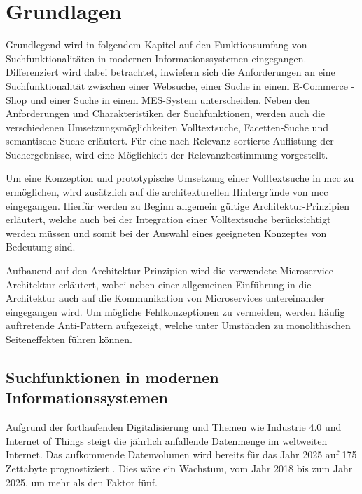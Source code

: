 \chapter{Grundlagen\label{chap2:Zweites-Kapitel}}

Grundlegend wird in folgendem Kapitel auf den Funktionsumfang von Suchfunktionalitäten in modernen Informationssystemen eingegangen. Differenziert wird dabei betrachtet, inwiefern sich die Anforderungen an eine Suchfunktionalität zwischen einer Websuche, einer Suche in einem E-Commerce - Shop und einer Suche in einem MES-System unterscheiden. Neben den Anforderungen und Charakteristiken der Suchfunktionen, werden auch die verschiedenen Umsetzungsmöglichkeiten \glqq Volltextsuche\grqq{}, \glqq Facetten-Suche\grqq{} und \glqq semantische Suche\grqq{} erläutert. Für eine nach Relevanz sortierte Auflistung der Suchergebnisse, wird eine Möglichkeit der Relevanzbestimmung vorgestellt.


Um eine Konzeption und prototypische Umsetzung einer Volltextsuche in \gls{mcc} zu ermöglichen, wird zusätzlich auf die architekturellen Hintergründe von \gls{mcc} eingegangen. Hierfür werden zu Beginn allgemein gültige Architektur-Prinzipien erläutert, welche auch bei der Integration einer Volltextsuche berücksichtigt werden müssen und somit bei der Auswahl eines geeigneten Konzeptes von Bedeutung sind.

Aufbauend auf den Architektur-Prinzipien wird die verwendete Microservice-Architektur erläutert, wobei neben einer allgemeinen Einführung in die Architektur auch auf die Kommunikation von Microservices untereinander eingegangen wird. Um mögliche Fehlkonzeptionen zu vermeiden, werden häufig auftretende Anti-Pattern aufgezeigt, welche unter Umständen zu monolithischen Seiteneffekten führen können.

\section{Suchfunktionen in modernen Informationssystemen\label{sec2.1:Unterpunkt-1}}

Aufgrund der fortlaufenden Digitalisierung und Themen wie \glqq Industrie 4.0\grqq{} und \glqq Internet of Things\grqq{} steigt die jährlich anfallende Datenmenge im weltweiten Internet. Das aufkommende Datenvolumen wird bereits für das Jahr 2025 auf 175 Zettabyte prognostiziert \cite{F.Tenzer.2018}. Dies wäre ein Wachstum, vom Jahr 2018 bis zum Jahr 2025, um mehr als den Faktor fünf.

